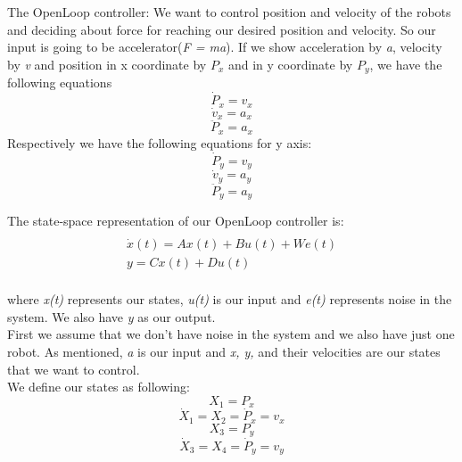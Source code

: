 \documentclass[10pt,letterpaper]{article}
\begin{document}
The OpenLoop controller: We want to control position and velocity of the robots and deciding about force for reaching our desired position and velocity. So our input is going to be accelerator(\emph{F = ma}). If we show acceleration by \emph{a}, velocity by \emph{v} and position in x coordinate by \emph{$P_x$} and in y coordinate by \emph{$P_y$}, we have the following equations
\begin{equation}
\dot{P}_x = v_x
\end{equation}
\begin{equation}
\dot{v}_x = a_x
\end{equation}
\begin{equation}
\ddot{P}_x= a_x
\end{equation}
Respectively we have the following equations for y axis:
\begin{equation}
\dot{P}_y= v_y
\end{equation}
\begin{equation}
\dot{v}_y = a_y
\end{equation}
\begin{equation}
\ddot{P}_y= a_y
\end{equation}


The state-space representation of our OpenLoop controller is: 
\begin{multline}
\\
\dot{x}(t)  =  A x(t) + B u(t) + We(t)\\
y = C x(t) + D u(t)\\
\end{multline}

where \emph{x(t)} represents our states, \emph{u(t)} is our input and \emph{e(t)} represents noise in the system. We also have \emph{y} as our output.\\
First we assume that we don't have noise in the system and we also have just one robot. As mentioned, \emph{a} is our input and \emph{x, y,} and their velocities are our states that we want to control.\\
We define our states as following:
\begin{equation}
X_1 = P_x 
\end{equation}
\begin{equation}
\dot{X}_1 = X_2 = \dot{P}_x = v_x
\end{equation}
\begin{equation}
X_3 = P_y 
\end{equation}
\begin{equation}
\dot{X}_3 = X_4 = \dot{P}_y = v_y 
\end{equation}
\end{document}
